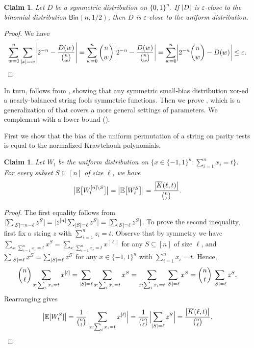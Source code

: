\documentclass[10pt,a4paper]{article}
\newtheorem{claim}[theorem]{Claim}
\theoremstyle{definition}
\newcommand{\E}{\mathop{\mathbb{E}\/}}
\newcommand{\eps}{\epsilon}
\newcommand{\ol}[1]{\overline{#1}}
\newcommand{\pmo}{\{-1,1\}}
\newcommand{\zo}{\{0,1\}}
\DeclarePairedDelimiter\abs{\lvert}{\rvert}
\def\Bin{\mathsf{Bin}}
\def\sK{\ol{K}}
\def\epsilon{\varepsilon}
\begin{document}
\begin{claim} \label{claim:sym-close-to-bin-implies-non-sym-close}
  Let $D$ be a symmetric distribution on $\zo^n$.
  If $\abs{D}$ is $\eps$-close to the binomial distribution $\Bin(n,1/2)$, then $D$ is $\eps$-close to the uniform distribution.
\end{claim}
\begin{proof}
  We have
  \[
    \sum_{w=0}^n \sum_{\abs{x}=w} \abs*{2^{-n} - \frac{D(w)}{\binom{n}{w}}}
  = \sum_{w=0}^n \binom{n}{w} \abs[\bigg] { 2^{-n} - \frac{D(w)}{\binom{n}{w}} }
  = \sum_{w=0}^n \abs[\bigg] { 2^{-n}\binom{n}{w} - D(w)}
    \le \eps . \qedhere
  \]
\end{proof}

In turn,  follows from , showing that any symmetric small-bias distribution xor-ed a nearly-balanced string fools symmetric functions.
Then we prove , which is a generalization of  that covers a more general settings of parameters.
We complement  with a lower bound ().

First we show that the bias of the uniform permutation of a string on parity tests is equal to the normalized Krawtchouk polynomials.

\begin{claim} \label{claim:bias-unif-weight}
  Let $W_t$ be the uniform distribution on $\{x \in \pmo^n: \sum_{i=1}^n x_i = t \}$.
  For every subset $S \subseteq [n]$ of size $\ell$, we have
  \[
    \abs[\big]{ \E\bigl[ W_t^{[n]\setminus S} \bigr] }
    = \abs[\big]{ \E\bigl[ W_t^S \bigr] }
    = \frac{\abs[\big]{\sK(\ell,t)}}{\binom{n}{\ell}} .
  \]
\end{claim}
\begin{proof}
  The first equality follows from $\abs{\sum_{\abs{S}=n-\ell} z^S} = \abs{ z^{[n]} \sum_{\abs{S}=\ell} z^S } = \abs{\sum_{\abs{S}=\ell} z^S}$.
  To prove the second inequality, first fix a string $z$ with $\sum_{i=1}^n z_i = t$.
  Observe that by symmetry we have $\sum_{x: \sum_{i=1}^n x_i = t} x^S = \sum_{x: \sum_{i=1}^n x_i = t} x^{[\ell]}$ for any $S \subseteq [n]$ of size $\ell$, and $\sum_{\abs{S}=\ell} x^S = \sum_{\abs{S}=\ell} z^S$ for any $x \in \pmo^n$ with $\sum_{i=1}^n x_i = t$.
  Hence,
  \[
    \binom{n}{\ell} \sum_{x: \sum_i x_i = t} x^{[\ell]}
    = \sum_{\abs{S} = \ell} \sum_{x: \sum_i x_i = t} x^S
    = \sum_{x: \sum_i x_i = t} \sum_{\abs{S} = \ell} x^S
    = \binom{n}{t} \sum_{\abs{S}=\ell} z^S .
  \]
  Rearranging gives
  \[
    \abs[\big]{\E[W_t^S]}
    = \frac{1}{\binom{n}{t}} \abs[\Big]{ \sum_{x: \sum_i x_i = t} x^{[\ell]}} 
    = \frac{1}{\binom{n}{\ell}} \abs[\Big]{\sum_{\abs{S}=\ell} z^{S}}
    = \frac{\abs[\big]{\sK(\ell,t)}}{\binom{n}{\ell}} . \qedhere
  \]
\end{proof}
\end{document}
